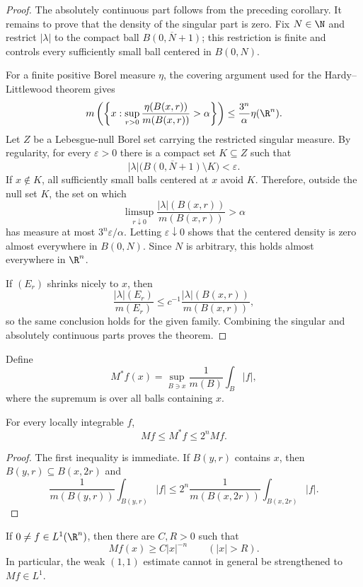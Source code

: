 \begin{proof}
The absolutely continuous part follows from the preceding corollary. It remains to prove that the density of the singular part is zero. Fix $N\in\N$ and restrict $|\lambda|$ to the compact ball $\overline{B(0,N+1)}$; this restriction is finite and controls every sufficiently small ball centered in $B(0,N)$.

For a finite positive Borel measure $\eta$, the covering argument used for the Hardy--Littlewood theorem gives
\[
m\left(\left\{x:\sup_{r>0}
\frac{\eta(B(x,r))}{m(B(x,r))}>\alpha\right\}\right)
\leq\frac{3^n}{\alpha}\eta(\R^n).
\]
Let $Z$ be a Lebesgue-null Borel set carrying the restricted singular measure. By regularity, for every $\varepsilon>0$ there is a compact set $K\subseteq Z$ such that
\[
|\lambda|\bigl(\overline{B(0,N+1)}\setminus K\bigr)<\varepsilon.
\]
If $x\notin K$, all sufficiently small balls centered at $x$ avoid $K$. Therefore, outside the null set $K$, the set on which
\[
\limsup_{r\downarrow0}
\frac{|\lambda|(B(x,r))}{m(B(x,r))}>\alpha
\]
has measure at most $3^n\varepsilon/\alpha$. Letting $\varepsilon\downarrow0$ shows that the centered density is zero almost everywhere in $B(0,N)$. Since $N$ is arbitrary, this holds almost everywhere in $\R^n$.

If $(E_r)$ shrinks nicely to $x$, then
\[
\frac{|\lambda|(E_r)}{m(E_r)}
\leq c^{-1}\frac{|\lambda|(B(x,r))}{m(B(x,r))},
\]
so the same conclusion holds for the given family. Combining the singular and absolutely continuous parts proves the theorem.
\end{proof}

\begin{de}
Define
\[
M^*f(x)=\sup_{B\ni x}\frac1{m(B)}\int_B|f|,
\]
where the supremum is over all balls containing $x$.
\end{de}

\begin{prop}
For every locally integrable $f$,
\[
Mf\leq M^*f\leq2^nMf.
\]
\end{prop}

\begin{proof}
The first inequality is immediate. If $B(y,r)$ contains $x$, then $B(y,r)\subseteq B(x,2r)$ and
\[
\frac1{m(B(y,r))}\int_{B(y,r)}|f|
\leq2^n\frac1{m(B(x,2r))}\int_{B(x,2r)}|f|.
\]
\end{proof}

\begin{exercise}
If $0\neq f\in L^1(\R^n)$, then there are $C,R>0$ such that
\[
Mf(x)\geq C|x|^{-n}
\qquad(|x|>R).
\]
In particular, the weak $(1,1)$ estimate cannot in general be strengthened to $Mf\in L^1$.
\end{exercise}

